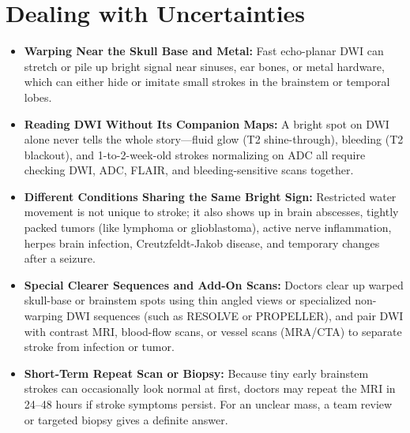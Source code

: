 \section{Dealing with Uncertainties}
\begin{itemize}
\item \textbf{Warping Near the Skull Base and Metal:} Fast echo-planar DWI can stretch or pile up bright signal near sinuses, ear bones, or metal hardware, which can either hide or imitate small strokes in the brainstem or temporal lobes.
\item \textbf{Reading DWI Without Its Companion Maps:} A bright spot on DWI alone never tells the whole story---fluid glow (T2 shine-through), bleeding (T2 blackout), and 1-to-2-week-old strokes normalizing on ADC all require checking DWI, ADC, FLAIR, and bleeding-sensitive scans together.
\item \textbf{Different Conditions Sharing the Same Bright Sign:} Restricted water movement is not unique to stroke; it also shows up in brain abscesses, tightly packed tumors (like lymphoma or glioblastoma), active nerve inflammation, herpes brain infection, Creutzfeldt-Jakob disease, and temporary changes after a seizure.
\item \textbf{Special Clearer Sequences and Add-On Scans:} Doctors clear up warped skull-base or brainstem spots using thin angled views or specialized non-warping DWI sequences (such as RESOLVE or PROPELLER), and pair DWI with contrast MRI, blood-flow scans, or vessel scans (MRA/CTA) to separate stroke from infection or tumor.
\item \textbf{Short-Term Repeat Scan or Biopsy:} Because tiny early brainstem strokes can occasionally look normal at first, doctors may repeat the MRI in 24--48 hours if stroke symptoms persist. For an unclear mass, a team review or targeted biopsy gives a definite answer.
\end{itemize}

